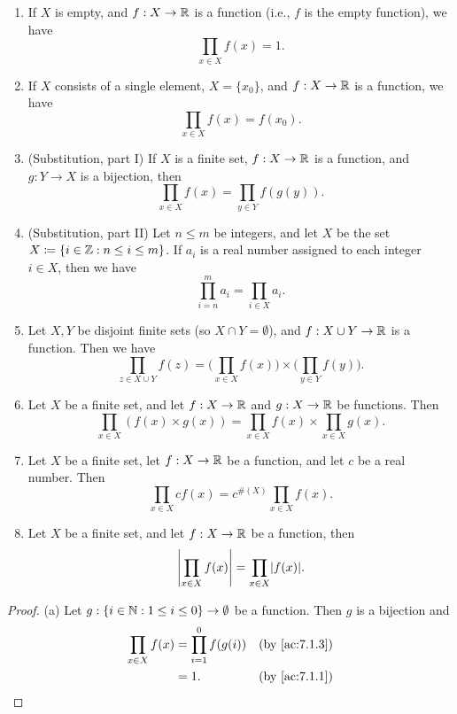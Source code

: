 \begin{ac}\label{ac:7.1.5}
  \mbox{}
  \begin{enumerate}
    \item If \(X\) is empty, and \(f : X \to \mathbb{R}\) is a function (i.e., \(f\) is the empty function), we have
          \[
            \prod_{x \in X} f(x) = 1.
          \]
    \item If \(X\) consists of a single element, \(X = \{x_0\}\), and \(f : X \to \mathbb{R}\) is a function, we have
          \[
            \prod_{x \in X} f(x) = f(x_0).
          \]
    \item (Substitution, part I) If \(X\) is a finite set, \(f : X \to \mathbb{R}\) is a function, and \(g : Y \to X\) is a bijection, then
          \[
            \prod_{x \in X} f(x) = \prod_{y \in Y} f(g(y)).
          \]
    \item (Substitution, part II) Let \(n \leq m\) be integers, and let \(X\) be the set \(X \coloneqq \{i \in \mathbb{Z} : n \leq i \leq m\}\).
          If \(a_i\) is a real number assigned to each integer \(i \in X\), then we have
          \[
            \prod_{i = n}^m a_i = \prod_{i \in X} a_i.
          \]
    \item Let \(X, Y\) be disjoint finite sets (so \(X \cap Y = \emptyset\)), and \(f : X \cup Y \to \mathbb{R}\) is a function.
          Then we have
          \[
            \prod_{z \in X \cup Y} f(z) = \Bigg(\prod_{x \in X} f(x)\Bigg) \times \Bigg(\prod_{y \in Y} f(y)\Bigg).
          \]
    \item Let \(X\) be a finite set, and let \(f : X \to \mathbb{R}\) and \(g : X \to \mathbb{R}\) be functions.
          Then
          \[
            \prod_{x \in X} (f(x) \times g(x)) = \prod_{x \in X} f(x) \times \prod_{x \in X} g(x).
          \]
    \item Let \(X\) be a finite set, let \(f : X \to \mathbb{R}\) be a function, and let \(c\) be a real number.
          Then
          \[
            \prod_{x \in X} cf(x) = c^{\#(X)} \prod_{x \in X} f(x).
          \]
    \item Let \(X\) be a finite set, and let \(f : X \to \mathbb{R}\) be a function, then
          \[
            \abs{\prod_{x \in X} f(x)} = \prod_{x \in X} \abs{f(x)}.
          \]
  \end{enumerate}
\end{ac}

\begin{proof}{(a)}
  Let \(g : \{i \in \mathbb{N} : 1 \leq i \leq 0\} \to \emptyset\) be a function.
  Then \(g\) is a bijection and
  \begin{align*}
    \prod_{x \in X} f(x) & = \prod_{i = 1}^0 f(g(i)) &  & \text{(by \cref{ac:7.1.3})} \\
                         & = 1.                      &  & \text{(by \cref{ac:7.1.1})}
  \end{align*}
\end{proof}

